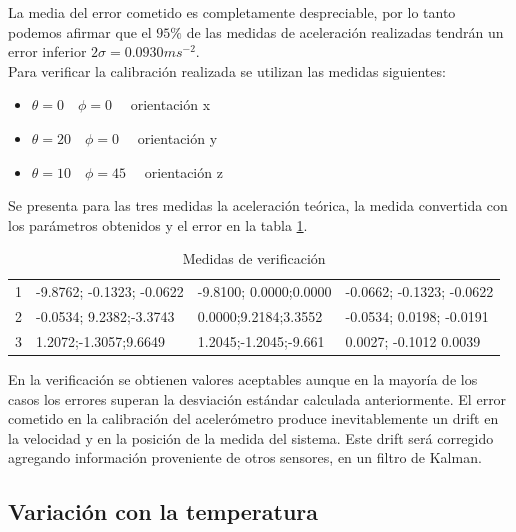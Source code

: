 \documentclass[main]{subfiles}
\begin{document}
La media del error cometido es completamente despreciable, por lo tanto podemos afirmar que el $95\% $ de las medidas de aceleración realizadas tendrán un error inferior $2\sigma=0.0930ms^{-2}$.\\
 
Para verificar la calibración realizada se utilizan las medidas siguientes:
\begin{itemize}
\item $\theta = 0 \quad \phi = 0 \quad$ orientación x
\item $\theta = 20 \quad \phi = 0 \quad$ orientación y
\item $\theta = 10 \quad \phi = 45 \quad$ orientación z
\end{itemize}

Se presenta para las tres medidas la aceleración teórica, la medida convertida con los parámetros obtenidos y el error en la tabla \ref{tab:diff}. 

\begin{table}[H]
\centering
\begin{tabular}{|p{100pt}|p{100pt}|p{100pt}|p{100pt}|}
\hline
\cellcolor[gray]{0.8}{Medida} & \cellcolor[gray]{0.8}{Aceleración Medida ($ms^{-2}$)}&\cellcolor[gray]{0.8}{Aceleración teórica($m^{-2}$)}& \cellcolor[gray]{0.8}{Error($ms^{-2}$)} \\
\hline
1 &  -9.8762; -0.1323; -0.0622   &  -9.8100; 0.0000;0.0000     & -0.0662; -0.1323; -0.0622\\
\hline
2 & -0.0534; 9.2382;-3.3743       &  0.0000;9.2184;3.3552     & -0.0534; 0.0198; -0.0191\\
\hline
3 & 1.2072;-1.3057;9.6649       &  1.2045;-1.2045;-9.661   & 0.0027; -0.1012 0.0039\\
\hline
\end{tabular}
\caption{Medidas de verificación}
\label{tab:diff}
\end{table}

En la verificaci\'on se obtienen valores aceptables aunque en la mayor\'ia de los casos los errores superan la desviaci\'on  est\'andar calculada anteriormente. El error cometido en la calibraci\'on del aceler\'ometro produce inevitablemente un drift en la velocidad y en la posici\'on de la medida del sistema. Este drift ser\'a corregido agregando informaci\'on proveniente de otros sensores, en un filtro de Kalman.


\subsection{Variación con la temperatura}
\end{document}
